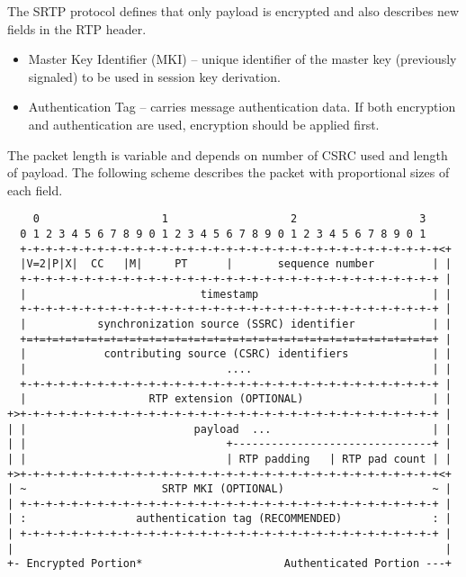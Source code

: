 The SRTP protocol defines that only payload is encrypted and also describes new 
fields in the RTP header.

\begin{itemize}
\item Master Key Identifier (MKI) -- unique identifier of the master key 
(previously signaled) to be used in session key derivation.
\item Authentication Tag -- carries message authentication data. If both
encryption and authentication are used, encryption should be applied first.
\end{itemize}

The packet length is variable and depends on number of CSRC used and length
of payload. The following scheme describes the packet with proportional
sizes of each field.

\begin{verbatim}
    0                   1                   2                   3
  0 1 2 3 4 5 6 7 8 9 0 1 2 3 4 5 6 7 8 9 0 1 2 3 4 5 6 7 8 9 0 1
  +-+-+-+-+-+-+-+-+-+-+-+-+-+-+-+-+-+-+-+-+-+-+-+-+-+-+-+-+-+-+-+-+<+
  |V=2|P|X|  CC   |M|     PT      |       sequence number         | |
  +-+-+-+-+-+-+-+-+-+-+-+-+-+-+-+-+-+-+-+-+-+-+-+-+-+-+-+-+-+-+-+-+ |
  |                           timestamp                           | |
  +-+-+-+-+-+-+-+-+-+-+-+-+-+-+-+-+-+-+-+-+-+-+-+-+-+-+-+-+-+-+-+-+ |
  |           synchronization source (SSRC) identifier            | |
  +=+=+=+=+=+=+=+=+=+=+=+=+=+=+=+=+=+=+=+=+=+=+=+=+=+=+=+=+=+=+=+=+ |
  |            contributing source (CSRC) identifiers             | |
  |                               ....                            | |
  +-+-+-+-+-+-+-+-+-+-+-+-+-+-+-+-+-+-+-+-+-+-+-+-+-+-+-+-+-+-+-+-+ |
  |                   RTP extension (OPTIONAL)                    | |
+>+-+-+-+-+-+-+-+-+-+-+-+-+-+-+-+-+-+-+-+-+-+-+-+-+-+-+-+-+-+-+-+-+ |
| |                          payload  ...                         | |
| |                               +-------------------------------+ |
| |                               | RTP padding   | RTP pad count | |
+>+-+-+-+-+-+-+-+-+-+-+-+-+-+-+-+-+-+-+-+-+-+-+-+-+-+-+-+-+-+-+-+-+<+
| ~                     SRTP MKI (OPTIONAL)                       ~ |
| +-+-+-+-+-+-+-+-+-+-+-+-+-+-+-+-+-+-+-+-+-+-+-+-+-+-+-+-+-+-+-+-+ |
| :                 authentication tag (RECOMMENDED)              : |
| +-+-+-+-+-+-+-+-+-+-+-+-+-+-+-+-+-+-+-+-+-+-+-+-+-+-+-+-+-+-+-+-+ |
|                                                                   |
+- Encrypted Portion*                      Authenticated Portion ---+
\end{verbatim}

